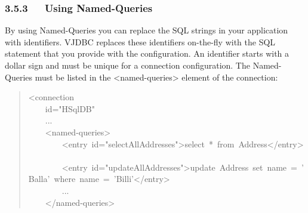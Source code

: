 \documentclass[10pt,a4paper,english]{article}
\newlength{\admonitionwidth}
\begin{document}
\begin{center}\begin{sffamily}
\end{sffamily}
\end{center}



\hypertarget{using-named-queries}{}
\subsubsection*{3.5.3~~~Using Named-Queries}

By using Named-Queries you can replace the SQL strings in your application with identifiers. VJDBC replaces these identifiers on-the-fly with the SQL statement that you provide with the configuration. An identifier starts with a dollar sign and must be unique for a connection configuration. The Named-Queries must be listed in the {\textless}named-queries{\textgreater} element of the connection:
\begin{quote}{\ttfamily \raggedright \noindent
<connection~\\
~~~~id="HSqlDB"~\\
~~~~...~\\
~~~~<named-queries>~\\
~~~~~~~~<entry~id="selectAllAddresses">select~*~from~Address</entry>~\\
~~~~~~~~<entry~id="updateAllAddresses">update~Address~set~name~=~'Balla'~where~name~=~'Billi'</entry>~\\
~~~~~~~~...~\\
~~~~</named-queries>
}\end{quote}
\end{document}
